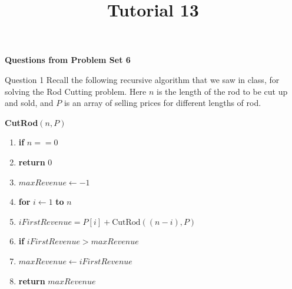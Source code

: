 \documentclass{beamer}
\title{Tutorial 13}
\date{}
\begin{document}
\maketitle


\begin{frame}
  \begin{center}
    \Large\textbf{Questions from Problem Set 6}
  \end{center}
\end{frame}

\begin{frame}{Question 1}
Recall the following recursive algorithm that we saw in class, for solving the Rod Cutting
problem. Here $n$ is the length of the rod to be cut up and sold, and $P$ is an array of selling
prices for different lengths of rod.

\medskip
\textbf{CutRod}$(n, P)$
\begin{enumerate}
  \item[\textbf{1}] \textbf{if} $n == 0$
  \item[\textbf{2}] \quad \textbf{return} 0
  \item[\textbf{3}] $maxRevenue \leftarrow -1$
  \item[\textbf{4}] \textbf{for} $i \leftarrow 1$ \textbf{to} $n$
  \item[\textbf{5}] \quad $iFirstRevenue = P[i] + \text{CutRod}((n-i), P)$
  \item[\textbf{6}] \quad \textbf{if} $iFirstRevenue > maxRevenue$
  \item[\textbf{7}] \quad\quad $maxRevenue \leftarrow iFirstRevenue$
  \item[\textbf{8}] \textbf{return} $maxRevenue$
\end{enumerate}
\end{frame}
\end{document}
